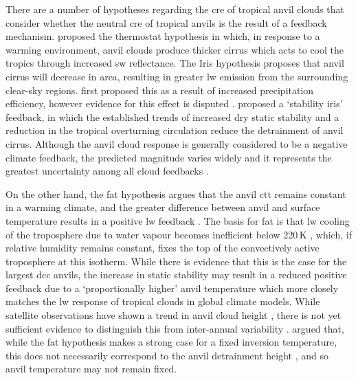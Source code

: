 \documentclass[acp, manuscript]{copernicus}
\begin{document}
There are a number of hypotheses regarding the \acrshort{cre} of tropical anvil clouds that consider whether the neutral \acrshort{cre} of tropical anvils is the result of a feedback mechanism. 
\citet{ramanathan_cloudradiative_1989} proposed the thermostat hypothesis in which, in response to a warming environment, anvil clouds produce thicker cirrus which acts to cool the tropics through increased \acrshort{sw} reflectance. 
The Iris hypothesis proposes that anvil cirrus will decrease in area, resulting in greater \acrshort{lw} emission from the surrounding clear-sky regions.
\citet{lindzen_does_2001} first proposed this as a result of increased precipitation efficiency, however evidence for this effect is disputed \citep{genio_climatic_2002, lin_examination_2004}.
\citet{bony_thermodynamic_2016} proposed a `stability iris' feedback, in which the established trends of increased dry static stability \citep{held_robust_2006} and a reduction in the tropical overturning circulation \citep{vecchi_global_2007} reduce the detrainment of anvil cirrus.
Although the anvil cloud response is generally considered to be a negative climate feedback, the predicted magnitude varies widely and it represents the greatest uncertainty among all cloud feedbacks \citep{sherwood_assessment_2020}.

On the other hand, the \acrfull{fat} hypothesis argues that the anvil \acrfull{ctt} remains constant in a warming climate, and the greater difference between anvil and surface temperature results in a positive \acrshort{lw} feedback \citep{hartmann_important_2002}.
The basis for \acrshort{fat} is that \acrshort{lw} cooling of the troposphere due to water vapour becomes inefficient below 220\,\unit{K} \citep{jeevanjee_simple_2020}, which, if relative humidity remains constant, fixes the top of the convectively active troposphere at this isotherm. 
While there is evidence that this is the case for the largest \acrshort{dcc} anvils, the increase in static stability may result in a reduced positive feedback due to a `proportionally higher' anvil temperature \citep{zelinka_why_2010} which more closely matches the \acrshort{lw} response of tropical clouds in global climate models.
While satellite observations have shown a trend in anvil cloud height \citep{norris_evidence_2016}, there is not yet sufficient evidence to distinguish this from inter-annual variability \citep{takahashi_when_2019}.
\citet{seeley_fat_2019} argued that, while the \acrshort{fat} hypothesis makes a strong case for a fixed inversion temperature, this does not necessarily correspond to the anvil detrainment height \citep{takahashi_level_2017, wang_observational_2020}, and so anvil temperature may not remain fixed.
\end{document}
